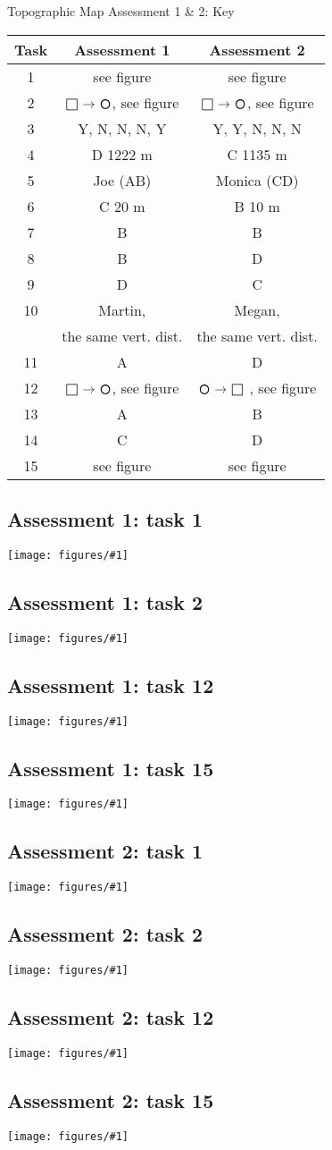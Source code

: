 \documentclass[12pt]{article}
\newcommand{\mysection}[1]{\subsection*{#1}}
\newcommand{\myimage}[1]{ \texttt{[image: figures/\#1]}}
\def\mycircle{\mathbin{\scalerel*{\circ}{j}}}
\def\mysquare{\mathord{\scalerel*{\Box}{gX}}}
\def\myarrow{\mathord{\rightarrow}}
\begin{document}

\begin{center}
\Huge
Topographic Map Assessment 1 \& 2: Key
\end{center}
\normalsize

\clearpage

% 
\large
\begin{center}
\begin{tabular}{|c|c|c|}
\rowcolor{gray!50}
\hline
 Task & Assessment 1 & Assessment 2\\ \hline \hline
 1& see figure & see figure \\
 2& $\mysquare\ \myarrow\ \mycircle$, see figure & $\mysquare\ \myarrow\ \mycircle$, see figure \\
 3& Y, N, N, N, Y& Y, Y, N, N, N\\
 4& D 1222 m & C 1135 m\\
 5& Joe (AB) & Monica (CD)  \\
 6& C 20 m & B 10 m \\
 7& B & B \\
 8& B & D \\
 9& D & C \\
 10& Martin, &  Megan, \\
  & the same vert. dist. & the same vert. dist.\\
 11& A & D \\
 12& $\mysquare\ \myarrow\ \mycircle$, see figure &  $\mycircle\ \myarrow\ \mysquare$ , see figure\\
 13& A & B \\
 14& C & D \\
 15& see figure & see figure \\\hline
 
\end{tabular}
\end{center}
\clearpage

\mysection{Assessment 1: task 1}
\myimage{task1_1_key.png}
\mysection{Assessment 1: task 2}
\myimage{task1_2_key.png}
\mysection{Assessment 1: task 12}
\myimage{task1_11_key.png}
\mysection{Assessment 1: task 15}
\myimage{task1_17_key.png}



\mysection{Assessment 2: task 1}
\myimage{task2_1_key.png}
\mysection{Assessment 2: task 2}
\myimage{task2_2_key.png}
\mysection{Assessment 2: task 12}
\myimage{task2_11_key.png}
\mysection{Assessment 2: task 15}
\myimage{task2_17_key.png}
\end{document}
